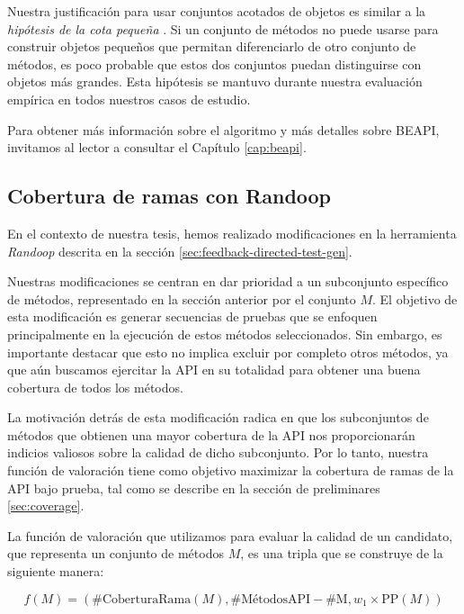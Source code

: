 Nuestra justificación para usar conjuntos acotados de objetos es similar a la \emph{hipótesis de la cota pequeña} \cite{Andoni:2003}. Si un conjunto de métodos no puede usarse para construir objetos pequeños que permitan diferenciarlo de otro conjunto de métodos, es poco probable que estos dos conjuntos puedan distinguirse con objetos más grandes. Esta hipótesis se mantuvo durante nuestra evaluación empírica en todos nuestros casos de estudio.

Para obtener más información sobre el algoritmo y más detalles sobre BEAPI, invitamos al lector a consultar el Capítulo \ref{cap:beapi}.

\subsection{Cobertura de ramas con Randoop}
\label{sec:fitnessRandoop}

En el contexto de nuestra tesis, hemos realizado modificaciones en la herramienta \emph{Randoop} descrita en la sección \ref{sec:feedback-directed-test-gen}.

Nuestras modificaciones se centran en dar prioridad a un subconjunto específico de métodos, representado en la sección anterior por el conjunto $M$. El objetivo de esta modificación es generar secuencias de pruebas que se enfoquen principalmente en la ejecución de estos métodos seleccionados. Sin embargo, es importante destacar que esto no implica excluir por completo otros métodos, ya que aún buscamos ejercitar la API en su totalidad para obtener una buena cobertura de todos los métodos.  

La motivación detrás de esta modificación radica en que los subconjuntos de métodos que obtienen una mayor cobertura de la API nos proporcionarán indicios valiosos sobre la calidad de dicho subconjunto. Por lo tanto, nuestra función de valoración tiene como objetivo maximizar la cobertura de ramas de la API bajo prueba, tal como se describe en la sección de preliminares \ref{sec:coverage}.

La función de valoración que utilizamos para evaluar la calidad de un candidato, que representa un conjunto de métodos $M$, es una tripla que se construye de la siguiente manera:

\begin{equation*}
f(M) = (\text{{\#CoberturaRama}}(M), \text{{\#MétodosAPI}} - \text{{\#M}}, w_1 \times \text{{PP}}(M))
\end{equation*}

